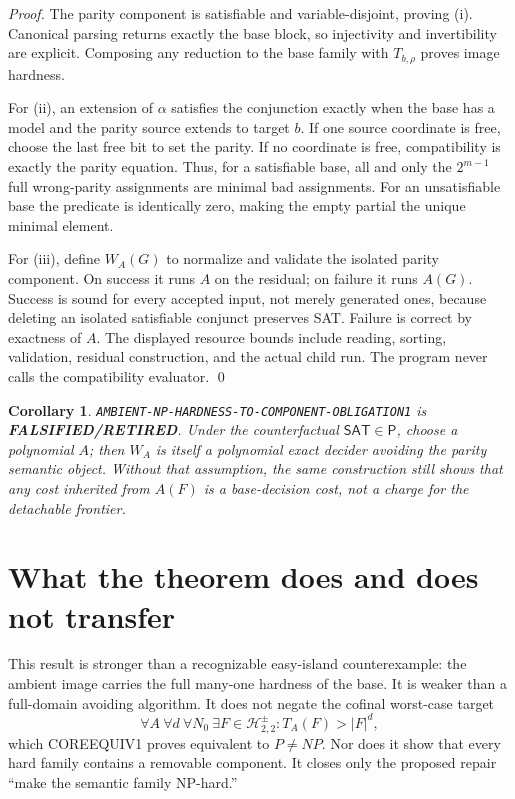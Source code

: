 \documentclass[11pt]{article}
\newtheorem{corollary}{Corollary}
\newcommand{\SAT}{\mathsf{SAT}}
\newcommand{\Hsigned}{\mathcal H^{\pm}_{2,2}}
\newcommand{\RETIRED}{\textbf{FALSIFIED/RETIRED}}
\begin{document}
\begin{proof}
The parity component is satisfiable and variable-disjoint, proving (i).
Canonical parsing returns exactly the base block, so injectivity and
invertibility are explicit.  Composing any reduction to the base family with
\(T_{b,\rho}\) proves image hardness.

For (ii), an extension of \(\alpha\) satisfies the conjunction exactly when
the base has a model and the parity source extends to target \(b\).  If one
source coordinate is free, choose the last free bit to set the parity.  If no
coordinate is free, compatibility is exactly the parity equation.  Thus, for
a satisfiable base, all and only the \(2^{m-1}\) full wrong-parity assignments
are minimal bad assignments.  For an unsatisfiable base the predicate is
identically zero, making the empty partial the unique minimal element.

For (iii), define \(W_A(G)\) to normalize and validate the isolated parity
component.  On success it runs \(A\) on the residual; on failure it runs
\(A(G)\).  Success is sound for every accepted input, not merely generated
ones, because deleting an isolated satisfiable conjunct preserves SAT.
Failure is correct by exactness of \(A\).  The displayed resource bounds
include reading, sorting, validation, residual construction, and the actual
child run.  The program never calls the compatibility evaluator.  \qed
\end{proof}

\begin{corollary}
\texttt{AMBIENT-NP-HARDNESS-TO-COMPONENT-OBLIGATION1} is \RETIRED.  Under
the counterfactual \(\SAT\in\mathsf P\), choose a polynomial \(A\); then
\(W_A\) is itself a polynomial exact decider avoiding the parity semantic
object.  Without that assumption, the same construction still shows that any
cost inherited from \(A(F)\) is a base-decision cost, not a charge for the
detachable frontier.
\end{corollary}

\section{What the theorem does and does not transfer}

This result is stronger than a recognizable easy-island counterexample: the
ambient image carries the full many-one hardness of the base.  It is weaker
than a full-domain avoiding algorithm.  It does not negate the cofinal
worst-case target
\[
\forall A\ \forall d\ \forall N_0\ \exists F\in\Hsigned:
T_A(F)>|F|^d,
\]
which COREEQUIV1 proves equivalent to \(P\ne NP\).  Nor does it show that
every hard family contains a removable component.  It closes only the proposed
repair ``make the semantic family NP-hard.''
\end{document}
